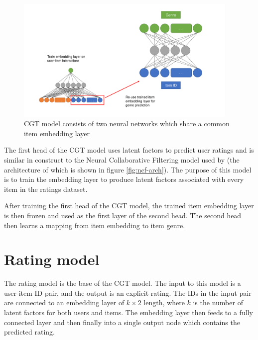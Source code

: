 \begin{figure}[H]
\centering
\includegraphics[width=0.95\textwidth]{Figures/4_CGT-model.pdf}
\decoRule
\caption[CGT architecture]{CGT model consists of two neural networks which share a common item embedding layer}
\label{fig:4_CGT-architecture}
\end{figure}

The first head of the CGT model uses latent factors to predict user ratings and is similar in construct to the Neural Collaborative Filtering model used by \citeauthor{he2017neural} (the architecture of which is shown in figure \ref{fig:ncf-arch}). The purpose of this model is to train the embedding layer to produce latent factors associated with every item in the ratings dataset.

After training the first head of the CGT model, the trained item embedding layer is then frozen and used as the first layer of the second head. The second head then learns a mapping from item embedding to item genre.

\section{Rating model}
The rating model is the base of the CGT model. The input to this model is a user-item ID pair, and the output is an explicit rating. The IDs in the input pair are connected to an embedding layer of $k\times2$ length, where $k$ is the number of latent factors for both users and items. The embedding layer then feeds to a fully connected layer and then finally into a single output node which contains the predicted rating.

